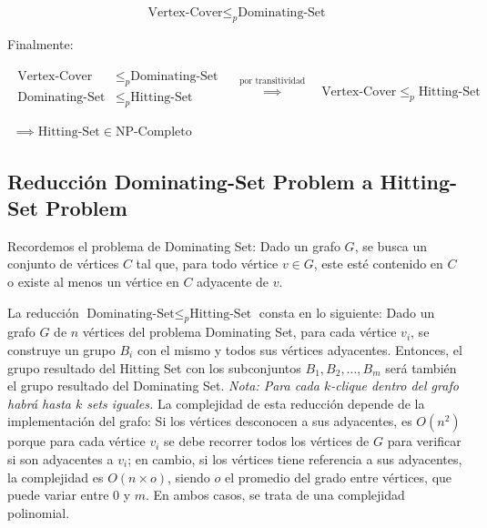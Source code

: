 \[\text{Vertex-Cover} \leq _{p} \text{Dominating-Set}\]


Finalmente:

\[
    \begin{array}{c}
        \begin{split}
            \text{Vertex-Cover}  & \leq _{p} \text{Dominating-Set} \\
            \text{Dominating-Set}  & \leq _{p} \text{Hitting-Set} \\
        \end{split}
        \quad \overset{ \text{por transitividad} }{ \implies  } \quad
        \text{Vertex-Cover}  \leq _{p} \text{Hitting-Set} \\ \\
        \implies \text{Hitting-Set} \in \text{NP-Completo}    
    \end{array}
\]

\subsection{Reducción Dominating-Set Problem a Hitting-Set Problem}

Recordemos el problema de Dominating Set: Dado un grafo $G$, se busca un conjunto de vértices $C$
tal que, para todo vértice $v \in G$, este esté contenido en $C$ o existe al menos un vértice en $C$ adyacente de $v$.

La reducción $\text{Dominating-Set} \leq_{p} \text{Hitting-Set}$ consta en lo siguiente:
Dado un grafo $G$ de $n$ vértices del problema Dominating Set, para cada vértice $v_{i}$, se construye un grupo $B_{i}$ con el mismo y todos sus vértices adyacentes. Entonces, el grupo resultado del Hitting Set con los subconjuntos $B_{1},B_{2},\dots,B_{m}$ será también el grupo resultado del Dominating Set. \textit{Nota: Para cada $k$-clique dentro del grafo habrá hasta $k$ sets iguales.} La complejidad de esta reducción depende de la implementación del grafo: Si los vértices desconocen a sus adyacentes, es $O(n^{2})$ porque para cada vértice $v_{i}$ se debe recorrer todos los vértices de $G$ para verificar si son adyacentes a $v_{i}$; en cambio, si los vértices tiene referencia a sus adyacentes, la complejidad es $O(n\times o)$, siendo $o$ el promedio del grado entre vértices, que puede variar entre $0$ y $m$. En ambos casos, se trata de una complejidad polinomial.

